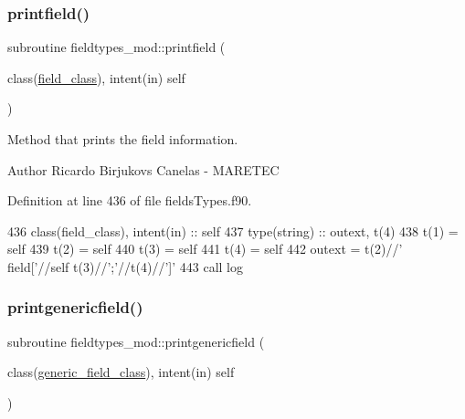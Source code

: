 \subsubsection{\texorpdfstring{printfield()}{printfield()}}
{\footnotesize\ttfamily subroutine fieldtypes\+\_\+mod\+::printfield (\begin{DoxyParamCaption}\item[{class(\mbox{\hyperlink{structfieldtypes__mod_1_1field__class}{field\+\_\+class}}), intent(in)}]{self }\end{DoxyParamCaption})\hspace{0.3cm}{\ttfamily [private]}}



Method that prints the field information. 

\begin{DoxyAuthor}{Author}
Ricardo Birjukovs Canelas -\/ M\+A\+R\+E\+T\+EC 
\end{DoxyAuthor}


Definition at line 436 of file fields\+Types.\+f90.


\begin{DoxyCode}
436     \textcolor{keywordtype}{class}(field\_class), \textcolor{keywordtype}{intent(in)} :: self
437     \textcolor{keywordtype}{type}(string) :: outext, t(4)
438     t(1) = self%
439     t(2) = self%
440     t(3) = self%
441     t(4) = self%
442     outext = t(2)//\textcolor{stringliteral}{' field['}//self%
      t(3)//\textcolor{stringliteral}{';'}//t(4)//\textcolor{stringliteral}{']'}
443     \textcolor{keyword}{call }log%
\end{DoxyCode}
\mbox{\label{namespacefieldtypes__mod_a63d399d72fffde3fe8169b76cce59259}} 
\subsubsection{\texorpdfstring{printgenericfield()}{printgenericfield()}}
{\footnotesize\ttfamily subroutine fieldtypes\+\_\+mod\+::printgenericfield (\begin{DoxyParamCaption}\item[{class(\mbox{\hyperlink{structfieldtypes__mod_1_1generic__field__class}{generic\+\_\+field\+\_\+class}}), intent(in)}]{self }\end{DoxyParamCaption})\hspace{0.3cm}{\ttfamily [private]}}



